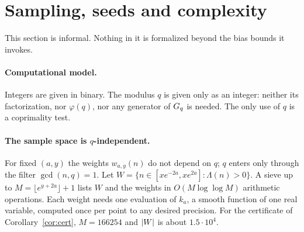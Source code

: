 \section{Sampling, seeds and complexity}\label{sec:complexity}

This section is informal. Nothing in it is formalized beyond the bias bounds it invokes.

\paragraph{Computational model.}
Integers are given in binary. The modulus $q$ is given only as an integer: neither its factorization,
nor $\varphi(q)$, nor any generator of $G_q$ is needed. The only use of $q$ is a coprimality test.

\paragraph{The sample space is $q$-independent.}
For fixed $(a,y)$ the weights $w_{a,y}(n)$ do not depend on $q$; $q$ enters only through the filter
$\gcd(n,q)=1$. Let $W=\{n\in[xe^{-2a},xe^{2a}]:\Lambda(n)>0\}$. A sieve up to $M=\lfloor e^{y+2a}\rfloor+1$
lists $W$ and the weights in $O(M\log\log M)$ arithmetic operations. Each weight needs one evaluation of
$k_a$, a smooth function of one real variable, computed once per point to any desired precision. For the
certificate of Corollary~\ref{cor:cert}, $M=166254$ and $\left\lvert W \right\rvert$ is about $1.5\cdot10^4$.

